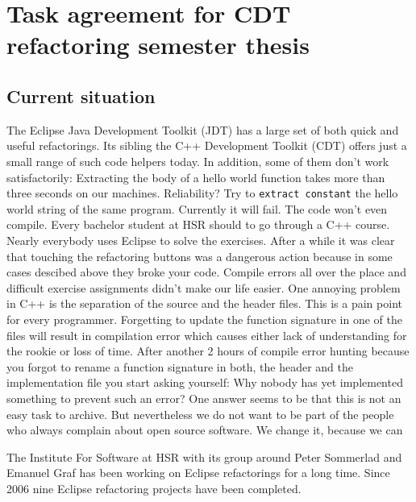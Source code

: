 \documentclass[a4paper,10pt]{scrreprt}
\begin{document}
\section*{Task agreement for CDT refactoring semester thesis}

\subsection*{Current situation}

The Eclipse Java Development Toolkit (JDT) has a large set of both quick and
useful refactorings. Its sibling the C++ Development Toolkit (CDT) offers just a
small range of such code helpers today. In addition, some of them don't work
satisfactorily: Extracting the body of a hello world function takes more than
three seconds on our machines. Reliability? Try to \texttt{extract constant} the
hello world string of the same program. Currently it will fail. The code won't even
compile.\newline
Every bachelor student at HSR should to go through a C++ course. Nearly
everybody uses Eclipse to solve the exercises. After a while it was clear that
touching the refactoring buttons was a dangerous action because in some cases
descibed above they broke your code. Compile errors all over the place and
difficult exercise assignments didn't make our life easier.\newline
One annoying problem in C++ is the separation of the source and the header
files. This is a pain point for every programmer. Forgetting to update the
function signature in one of the files will result in compilation error which
causes either lack of understanding for the rookie or loss of time.\newline
After another 2 hours of compile error hunting because you forgot to rename a
function signature in both, the header and the implementation file you start
asking yourself: Why nobody has yet implemented something to prevent such an
error?\newline
One answer seems to be that this is not an easy task to archive. But
nevertheless we do not want to be part of the people who always complain about
open source software. We change it, because we can\newline
 
The Institute For Software at HSR with its group around Peter Sommerlad and
Emanuel Graf has been working on Eclipse refactorings for a long time. Since
2006 nine Eclipse refactoring projects have been completed.\newline
\end{document}
